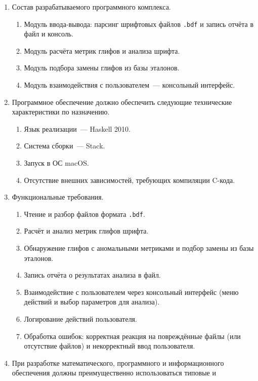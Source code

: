 \begin{enumerate}
\begin{enumerate}[label=\alph*.]
        \item Состав разрабатываемого программного комплекса.
        \begin{enumerate}
            \item Модуль ввода-вывода: парсинг шрифтовых файлов \verb|.bdf| и запись отчёта в файл и консоль.
            \item Модуль расчёта метрик глифов и анализа шрифта.
            \item Модуль подбора замены глифов из базы эталонов.
            \item Модуль взаимодействия с пользователем~--- консольный интерфейс.
        \end{enumerate}
        \item Программное обеспечение должно обеспечить следующие
        технические характеристики по назначению.
        \begin{enumerate}
            \item Язык реализации~--- Haskell 2010.
            \item Система сборки~--- Stack.
            \item Запуск в ОС macOS.
            \item Отсутствие внешних зависимостей, требующих компиляции C-кода.
        \end{enumerate}
        \item Функциональные требования.
        \begin{enumerate}
            \item Чтение и разбор файлов формата \verb|.bdf|.
            \item Расчёт и анализ метрик глифов шрифта.
            \item Обнаружение глифов с аномальными метриками и подбор замены из базы эталонов.
            \item Запись отчёта о результатах анализа в файл.
            \item Взаимодействие с пользователем через консольный интерфейс (меню действий и выбор параметров для анализа).
            \item Логирование действий пользователя.
            \item Обработка ошибок: корректная реакция на повреждённые файлы (или отсутствие файлов) и некорректный ввод пользователя.
        \end{enumerate}
        \item При разработке математического, программного и информационного
        обеспечения должны преимущественно использоваться типовые и

\end{enumerate}
\end{enumerate}
